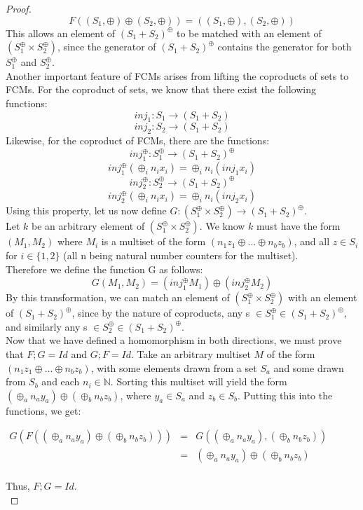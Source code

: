 \begin{lemma}
\begin{proof}
\[F((S_1, \oplus) \oplus (S_2, \oplus)) = ((S_1, \oplus), (S_2, \oplus))\]
This allows an element of $(S_1 + S_2)^\oplus$ to be matched with an element of $(S_1 ^\oplus \times S_2 ^\oplus)$, since the generator of $(S_1 + S_2)^\oplus$ contains the generator for both $S_1^\oplus$ and $S_2^\oplus$.\bigskip\\ 
Another important feature of FCMs arises from lifting the coproducts of sets to FCMs. For the coproduct of sets, we know that there exist the following functions:\\
\[inj_1: S_1 \to (S_1 + S_2) \]
\[inj_2: S_2 \to (S_1 + S_2)\]
Likewise, for the coproduct of FCMs, there are the functions: \\
\[inj^\oplus_1: S_1^\oplus \to (S_1 + S_2)^\oplus  \]
\[inj^\oplus_1(\oplus_i n_i x_i) = \oplus_i n_i(inj_1 x_i)\]
\smallskip
\[inj^\oplus_2: S_2^\oplus \to (S_1 + S_2)^\oplus \]
\[ inj^\oplus_2(\oplus_i n_i x_i) = \oplus_i n_i(inj_2 x_i)\]
Using this property, let us now define $G: (S_1 ^\oplus \times S_2 ^\oplus) \to (S_1 + S_2)^\oplus$.\\
Let $k$ be an arbitrary element of $(S_1 ^\oplus \times S_2 ^\oplus)$. We know $k$ must have the form $(M_1 , M_2)$ where $M_i$ is a multiset of the form $(n_1z_1 \oplus ... \oplus n_bz_b)$, and all $z \in S_i$ for $i\in\{1, 2\}$ (all n being natural number counters for the multiset).\\
Therefore we define the function G as follows:\\
\[G(M_1, M_2) = (inj_1^\oplus M_1) \oplus (inj_2^\oplus M_2)\]
By this transformation, we can match an element of $(S_1 ^\oplus \times S_2 ^\oplus)$ with an element of $(S_1 + S_2)^\oplus$, since by the nature of coproducts, any s $\in S_1^\oplus \in (S_1+S_2)^\oplus$, and similarly any s $\in S_2^\oplus \in (S_1+S_2)^\oplus$.\bigskip \\

Now that we have defined a homomorphism in both directions, we must
prove that $F;G = Id$ and $G;F = Id$. Take an arbitrary multiset $M$
of the form $(n_1z_1 \oplus ... \oplus n_bz_b)$, with some elements
drawn from a set $S_a$ and some drawn from $S_b$ and each $n_i \in
\mathbb{N}$. Sorting this multiset will yield the form $(\oplus_a n_a
y_a) \oplus (\oplus_b n_b z_b)$, where $y_a \in S_a$ and $z_b \in
S_b$. Putting this into the functions, we get:
\begin{center}
  \begin{math}
    \begin{array}{lll}
      G(F((\oplus_a n_a y_a) \oplus (\oplus_b n_b z_b)))
      & = & G((\oplus_a n_a y_a), (\oplus_b n_b z_b))\\
      & = & (\oplus_a n_a y_a) \oplus (\oplus_b n_b z_b)\\
    \end{array}
  \end{math}
\end{center}
Thus, $F;G = Id$.\\


\end{proof}
\end{lemma}
